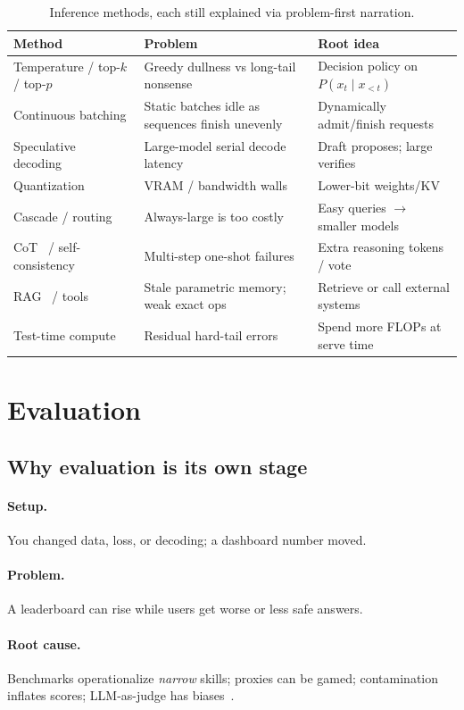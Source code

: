 \documentclass[11pt,a4paper]{article}
\newcommand{\layer}[1]{\paragraph{#1.}}
\newcommand{\setup}{\layer{Setup}}
\newcommand{\problem}{\layer{Problem}}
\newcommand{\rootcause}{\layer{Root cause}}
\begin{document}
\begin{table}[ht]
\centering
\small
\begin{tabularx}{\textwidth}{@{}lYY@{}}
\toprule
\textbf{Method} & \textbf{Problem} & \textbf{Root idea} \\
\midrule
Temperature / top-\(k\) / top-\(p\)~\cite{holtzman2019curious} & Greedy dullness vs long-tail nonsense & Decision policy on \(P(x_t\mid x_{<t})\) \\
Continuous batching & Static batches idle as sequences finish unevenly & Dynamically admit/finish requests \\
Speculative decoding~\cite{leviathan2023speculative} & Large-model serial decode latency & Draft proposes; large verifies \\
Quantization & VRAM / bandwidth walls & Lower-bit weights/KV \\
Cascade / routing~\cite{ong2025routellm,ding2024hybrid} & Always-large is too costly & Easy queries $\to$ smaller models \\
CoT~\cite{wei2022cot} / self-consistency~\cite{wang2022selfconsistency} & Multi-step one-shot failures & Extra reasoning tokens / vote \\
RAG~\cite{lewis2020rag} / tools & Stale parametric memory; weak exact ops & Retrieve or call external systems \\
Test-time compute & Residual hard-tail errors & Spend more FLOPs at serve time \\
\bottomrule
\end{tabularx}
\caption{Inference methods, each still explained via problem-first narration.}
\label{tab:infer-methods}
\end{table}

\section{Evaluation}
\label{sec:eval}

\subsection{Why evaluation is its own stage}
\label{sec:eval-why}

\setup
You changed data, loss, or decoding; a dashboard number moved.

\problem
A leaderboard can rise while users get worse or less safe answers.

\rootcause
Benchmarks operationalize \emph{narrow} skills; proxies can be gamed; contamination inflates scores; LLM-as-judge has biases~\cite{zheng2023judging}.
\end{document}
